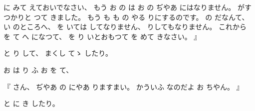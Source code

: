 %
に
みて
えておいでなさい、
%
もう
お
の
は
お
の
ぢやあ
にはなりません。
%
がすつかりと
つて
きました。
%
もう
も
も
の
やる
りにするのです。
%
の
だなんて、
%
い
のところへ、
%
を
いては
してなりません、
%
りしてもなりません。
%
これから
を
て
へ
になつて、
%
を
り
いとおもつて
を
めて
きなさい。
』

%
と
り
して、
%
まくし
てゝ
したり。

%
お
は
り
ふ
お
を
て、

%
『
さん、
%
ぢやあ
の
にやあ
りますまい。
%
かういふ
なのだよ
お
ちやん。
』

%
と
に
き
したり。
